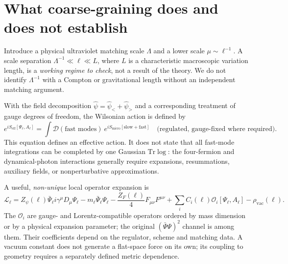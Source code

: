 \documentclass[11pt,a4paper]{article}
\newcommand{\Tr}{\mathrm{Tr}}
\newcommand{\Lagr}{\mathcal L}
\newcommand{\Seff}{S_{\mathrm{eff}}}
\begin{document}
\section{What coarse-graining does and does not establish}\label{sec:coarse}
Introduce a physical ultraviolet matching scale $\Lambda$ and a lower scale $\mu\sim\ell^{-1}$. A scale separation $\Lambda^{-1}\ll\ell\ll L$, where $L$ is a characteristic macroscopic variation length, is a \emph{working regime to check}, not a result of the theory. We do not identify $\Lambda^{-1}$ with a Compton or gravitational length without an independent matching argument.

With the field decomposition $\hat\psi=\hat\psi_<+\hat\psi_>$ and a corresponding treatment of gauge degrees of freedom, the Wilsonian action is defined by
\begin{equation}\label{eq:Wilsonian}
e^{i\Seff[\Psi_\ell,A_\ell]}
=\int\!\mathcal D(\text{fast modes})\ e^{iS_{\mathrm{micro}}[\text{slow}+\text{fast}]}
\quad\text{(regulated, gauge-fixed where required)}.
\end{equation}
This equation defines an effective action. It does not state that all fast-mode integrations can be completed by one Gaussian $\Tr\log$: the four-fermion and dynamical-photon interactions generally require expansions, resummations, auxiliary fields, or nonperturbative approximations.

A useful, \emph{non-unique} local operator expansion is
\begin{equation}\label{eq:EFT}
\Lagr_{\ell} = Z_\psi(\ell)\bar\Psi_\ell i\gamma^\mu D_\mu\Psi_\ell
-m_\ell\bar\Psi_\ell\Psi_\ell
-\frac{Z_F(\ell)}{4}F_{\mu\nu}F^{\mu\nu}
+\sum_i C_i(\ell)\mathcal O_i[\Psi_\ell,A_\ell]
-\rho_{\mathrm{vac}}(\ell).
\end{equation}
The $\mathcal O_i$ are gauge- and Lorentz-compatible operators ordered by mass dimension or by a physical expansion parameter; the original $(\bar\Psi\Psi)^2$ channel is among them. Their coefficients depend on the regulator, scheme and matching data. A vacuum constant does not generate a flat-space force on its own; its coupling to geometry requires a separately defined metric dependence.
\end{document}
